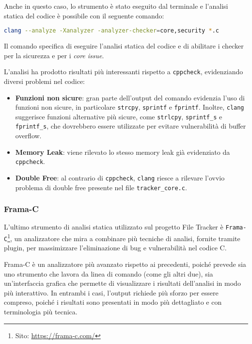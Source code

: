 Anche in questo caso, lo strumento è stato eseguito dal terminale e l'analisi statica
del codice è possibile con il seguente comando:
\begin{lstlisting}[language=bash, numbers=none]
clang --analyze -Xanalyzer -analyzer-checker=core,security *.c
\end{lstlisting}
Il comando specifica di eseguire l'analisi statica del codice e di abilitare i
checker per la sicurezza e per i \textit{core issue}.

L'analisi ha prodotto risultati più interessanti rispetto a \texttt{cppcheck}, evidenziando
diversi problemi nel codice:
\begin{itemize}
  \item \textbf{Funzioni non sicure}: gran parte dell'output del comando evidenzia
    l'uso di funzioni non sicure, in particolare \texttt{strcpy}, \texttt{sprintf}
    e \texttt{fprintf}. Inoltre, \texttt{clang} suggerisce funzioni alternative più
    sicure, come \texttt{strlcpy}, \texttt{sprintf\_s} e \texttt{fprintf\_s}, che
    dovrebbero essere utilizzate per evitare vulnerabilità di buffer overflow.

  \item \textbf{Memory Leak}: viene rilevato lo stesso memory leak già evidenziato
    da \texttt{cppcheck}.

  \item \textbf{Double Free}: al contrario di \texttt{cppcheck}, \texttt{clang}
    riesce a rilevare l'ovvio problema di double free presente nel file \texttt{tracker\_core.c}.
\end{itemize}

\subsubsection*{Frama-C}
L'ultimo strumento di analisi statica utilizzato sul progetto File Tracker è \texttt{Frama-C}\footnote{Sito:
\url{https://frama-c.com/}}, un analizzatore che mira a combinare più tecniche
di analisi, fornite tramite plugin, per massimizzare l'eliminazione di bug e
vulnerabilità nel codice C.

Frama-C è un analizzatore più avanzato rispetto ai precedenti, poiché prevede sia
uno strumento che lavora da linea di comando (come gli altri due), sia un'interfaccia
grafica che permette di visualizzare i risultati dell'analisi in modo più
interattivo. In entrambi i casi, l'output richiede più sforzo per essere
compreso, poiché i risultati sono presentati in modo più dettagliato e con terminologia
più tecnica.


